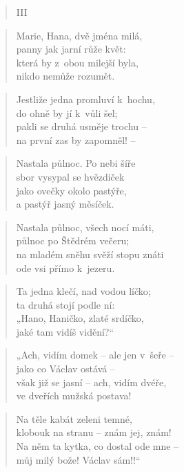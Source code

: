 \begin{verse}
III
\end{verse}

\begin{verse}
Marie, Hana, dvě jména milá, \\
panny jak jarní růže květ: \\
která by z~obou milejší byla, \\
nikdo nemůže rozumět.
\end{verse}

\begin{verse}
Jestliže jedna promluví k~hochu, \\
do ohně by jí k~vůli šel; \\
pakli se druhá usměje trochu -- \\
na první zas by zapomněl! --
\end{verse}

\begin{verse}
Nastala půlnoc. Po nebi šíře \\
sbor vysypal se hvězdiček \\
jako ovečky okolo pastýře, \\
a pastýř jasný měsíček.
\end{verse}

\begin{verse}
Nastala půlnoc, všech nocí máti, \\
půlnoc po Štědrém večeru; \\
na mladém sněhu svěží stopu znáti \\
ode vsi přímo k~jezeru.
\end{verse}

\begin{verse}
Ta jedna klečí, nad vodou líčko; \\
ta druhá stojí podle ní: \\
„Hano, Haničko, zlaté srdíčko, \\
jaké tam vidíš vidění?“
\end{verse}

\begin{verse}
„Ach, vidím domek -- ale jen v~šeře -- \\
jako co Václav ostává -- \\
však již se jasní -- ach, vidím dvéře, \\
ve dveřích mužská postava!
\end{verse}

\begin{verse}
Na těle kabát zeleni temné, \\
klobouk na stranu -- znám jej, znám! \\
Na něm ta kytka, co dostal ode mne -- \\
můj milý bože! Václav sám!!“
\end{verse}

